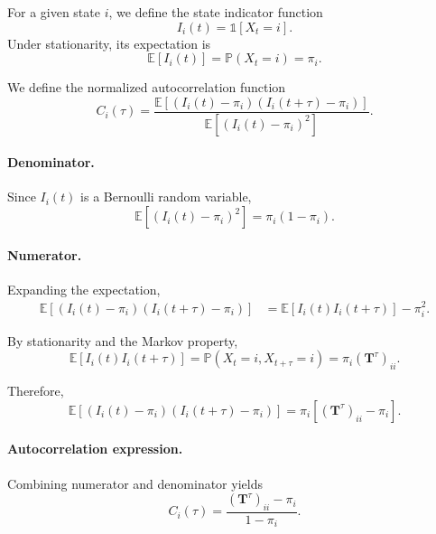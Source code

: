 \documentclass[11pt]{article}
\begin{document}
For a given state $i$, we define the state indicator function
\begin{equation}
    I_i(t) = \mathbb{1}[X_t = i].
\end{equation}
Under stationarity, its expectation is
\begin{equation}
    \mathbb{E}[I_i(t)] = \mathbb{P}(X_t = i) = \pi_i.
\end{equation}

We define the normalized autocorrelation function
\begin{equation}
    C_i(\tau)
    =
    \frac{
        \mathbb{E}\!\left[(I_i(t)-\pi_i)(I_i(t+\tau)-\pi_i)\right]
    }{
        \mathbb{E}\!\left[(I_i(t)-\pi_i)^2\right]
    }.
\end{equation}

\paragraph{Denominator.}
Since $I_i(t)$ is a Bernoulli random variable,
\begin{equation}
    \mathbb{E}\!\left[(I_i(t)-\pi_i)^2\right]
    = \pi_i(1-\pi_i).
\end{equation}

\paragraph{Numerator.}
Expanding the expectation,
\begin{equation}
\begin{aligned}
    \mathbb{E}\!\left[(I_i(t)-\pi_i)(I_i(t+\tau)-\pi_i)\right]
    &=
    \mathbb{E}[I_i(t)I_i(t+\tau)] - \pi_i^2.
\end{aligned}
\end{equation}

By stationarity and the Markov property,
\begin{equation}
    \mathbb{E}[I_i(t)I_i(t+\tau)]
    =
    \mathbb{P}(X_t=i, X_{t+\tau}=i)
    =
    \pi_i (\mathbf{T}^\tau)_{ii}.
\end{equation}

Therefore,
\begin{equation}
    \mathbb{E}\!\left[(I_i(t)-\pi_i)(I_i(t+\tau)-\pi_i)\right]
    =
    \pi_i \left[(\mathbf{T}^\tau)_{ii} - \pi_i \right].
\end{equation}

\paragraph{Autocorrelation expression.}
Combining numerator and denominator yields
\begin{equation}
    C_i(\tau)
    =
    \frac{(\mathbf{T}^\tau)_{ii} - \pi_i}{1-\pi_i}.
\end{equation}
\end{document}
